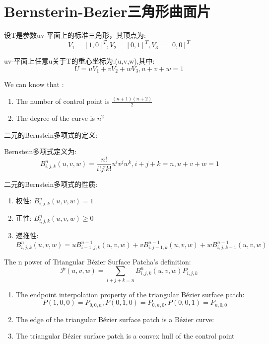 \newpage
\chapter{Bernsterin-Bezier三角形曲面片}
设T是参数uv-平面上的标准三角形，其顶点为:
\[
  V_1 = [1,0]^T,V_2 = [0,1]^T,V_3 = [0,0]^T
\]

uv-平面上任意u关于T的重心坐标为:(u,v,w),其中:
\[
  U = uV_1+vV_2+wV_3,u+v+w= 1
\]
\begin{remark}
   We can know that :
   \begin{enumerate}
    \item The number of control point is $\frac{(n+1)(n+2)}{2}$
    \item The degree of the curve is $n^2$
   \end{enumerate}
\end{remark}
二元的Bernstein多项式的定义:
\begin{definition}
  Bernstein多项式定义为:
  \[
  \,B_{i,j,k}^{n}(u,v,w) = \frac{n!}{i!j!k!}u^{i}v^{j}w^{k},i+j+k=n,u+v+w=1
  \]
\end{definition}

二元的Bernstein多项式的性质:
\begin{enumerate}
  \item 权性: $B_{i,j,k}^{n}(u,v,w) = 1$
  \item 正性: $B_{i,j,k}^{n}(u,v,w) \geq 0$
  \item 递推性: $B_{i,j,k}^{n}(u,v,w) = uB_{i-1,j,k}^{n-1}(u,v,w) + vB_{i,j-1,k}^{n-1}(u,v,w) + wB_{i,j,k-1}^{n-1}(u,v,w)$
\end{enumerate}

\begin{definition}
  
The n power of Triangular Bézier Surface Patcha's definition:
\[
  \mathcal{P}(u,v,w) = \sum_{i+j+k=n}B_{i,j,k}^{n}(u,v,w)P_{i,j,k}
\]
\end{definition} 

\begin{remark}
   \begin{enumerate}
    \item The endpoint interpolation property of the triangular Bézier surface patch:\[
      P(1,0,0) = P_{0,0,n},P(0,1,0) = P_{0,n,0},P(0,0,1) = P_{n,0,0}
    \]
  \item The edge of the triangular Bézier surface patch is a Bézier curve:
  \item The triangular Bézier surface patch is a convex hull of the control point 
\end{enumerate}
\end{remark}
